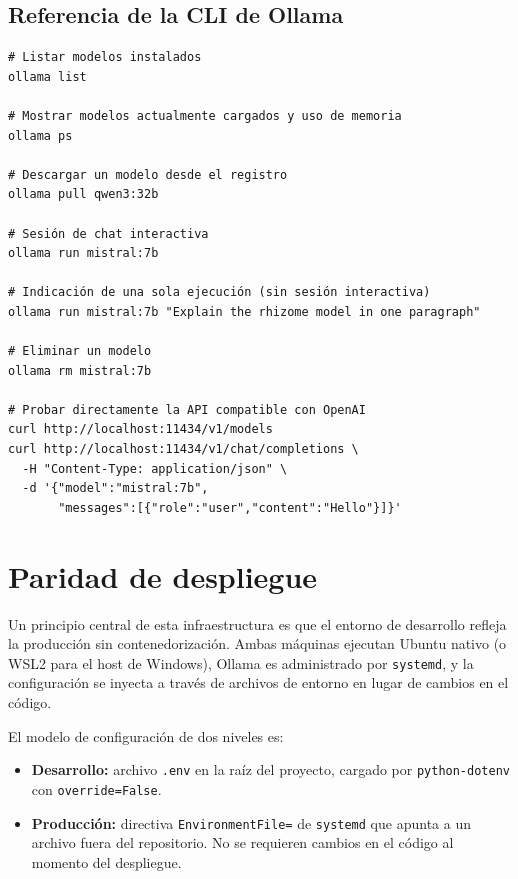 \subsection{Referencia de la CLI de Ollama}

\begin{lstlisting}[style=bashstyle, caption={Comandos esenciales de la CLI de Ollama}]
# Listar modelos instalados
ollama list

# Mostrar modelos actualmente cargados y uso de memoria
ollama ps

# Descargar un modelo desde el registro
ollama pull qwen3:32b

# Sesión de chat interactiva
ollama run mistral:7b

# Indicación de una sola ejecución (sin sesión interactiva)
ollama run mistral:7b "Explain the rhizome model in one paragraph"

# Eliminar un modelo
ollama rm mistral:7b

# Probar directamente la API compatible con OpenAI
curl http://localhost:11434/v1/models
curl http://localhost:11434/v1/chat/completions \
  -H "Content-Type: application/json" \
  -d '{"model":"mistral:7b",
       "messages":[{"role":"user","content":"Hello"}]}'
\end{lstlisting}

\section{Paridad de despliegue}
\label{sec:parity}

Un principio central de esta infraestructura es que el entorno de
desarrollo refleja la producción sin contenedorización. Ambas máquinas
ejecutan Ubuntu nativo (o WSL2 para el host de Windows), Ollama es
administrado por \texttt{systemd}, y la configuración se inyecta a través
de archivos de entorno en lugar de cambios en el código.

El modelo de configuración de dos niveles es:

\begin{itemize}
  \item \textbf{Desarrollo:} archivo \texttt{.env} en la raíz del proyecto,
        cargado por \texttt{python-dotenv} con \texttt{override=False}.
  \item \textbf{Producción:} directiva \texttt{EnvironmentFile=} de
        \texttt{systemd} que apunta a un archivo fuera del repositorio.
        No se requieren cambios en el código al momento del despliegue.
\end{itemize}

